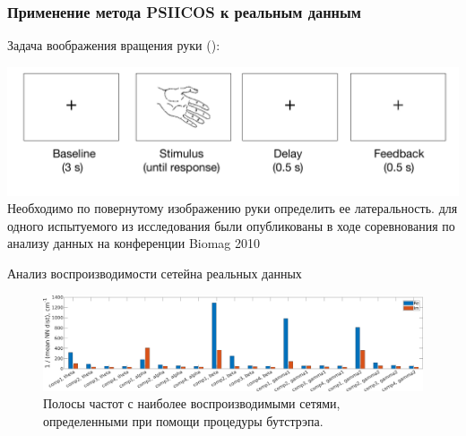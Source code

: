 \documentclass[12pt]{beamer}
\begin{document}
\begin{frame}[t]
    \frametitle{Применение метода PSIICOS к реальным данным}
    
    \vspace{1cm}
    \centering
    {\small Задача воображения вращения руки (\cite{DeLangeHensen2008}):}

    \includegraphics[width=1\textwidth]{./real_data.png}
    {\tiny Необходимо по повернутому изображению руки определить ее латеральность.}
    { для одного испытуемого из исследования \cite{DeLangeHensen2008} были опубликованы в ходе соревнования по анализу данных на конференции Biomag 2010}
\end{frame}

\begin{frame}[t]{Анализ воспроизводимости сетей}{на реальных данных}
    \vspace{1cm}
    \begin{figure}[h!tpb]
     \includegraphics[width=1\textwidth]{../images/psiicos_paper/Figure10_hr.jpg}
     {\small Полосы частот с наиболее воспроизводимыми сетями, определенными при помощи
     процедуры бутстрэпа.}
     \end{figure} %
\end{frame}
\end{document}
